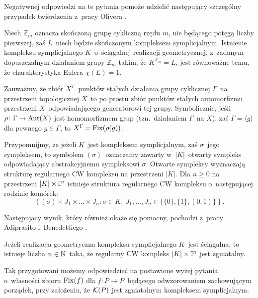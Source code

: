 Negatywnej odpowiedzi na te pytania pomoże udzielić następujący szczególny przypadek twierdzenia z~pracy Olivera \cite{Oliver75}.

\begin{tw}\label{tw_olivera}
Niech $\mathbb{Z}_m$ oznacza skończoną grupę cykliczną rzędu $m$, nie będącego potęgą liczby pierwszej, zaś $L$~niech będzie skończonym kompleksem symplicjalnym. Istnienie kompleksu symplicjalnego $K$~o~ściągalnej realizacji geometrycznej, z~zadanym dopuszczalnym działaniem grupy $\mathbb{Z}_m$ takim, że $K^{\mathbb{Z}_m}=L$, jest równoważne temu, że charakterystyka Eulera $\chi(L)=1$.
\end{tw}

Zauważmy, że zbiór $X^\Gamma$~punktów stałych działania grupy cyklicznej $\Gamma$~na przestrzeni topologicznej $X$~to po prostu zbiór punktów stałych automorfizmu przestrzeni $X$~odpowiadającego generatorowi tej grupy. Symbolicznie, jeśli \mbox{$\rho\colon \Gamma\to \operatorname{Aut}(X)$} jest homomorfizmem grup (tzn.~działaniem $\Gamma$~na $X$), zaś $\Gamma=\langle g\rangle$ dla pewnego $g\in \Gamma$, to $X^\Gamma=\operatorname{Fix}(\rho(g))$.

Przypomnijmy, że jeżeli $K$~jest kompleksem symplicjalnym, zaś $\sigma$~jego sympleksem, to symbolem $(\sigma)$~oznaczamy zawarty w~$|K|$~otwarty sympleks odpowiadający abstrakcyjnemu sympleksowi $\sigma$. Otwarte sympleksy wyznaczają strukturę regularnego CW kompleksu na przestrzeni $|K|$. Dla $n\geq 0$ na przestrzeni $|K|\times \mathbb{I}^n$ istnieje struktura regularnego CW kompleksu o~następującej rodzinie komórek:
\[\left\{(\sigma)\times J_1\times\ldots \times J_n:\sigma\in K,\ J_1,\ldots, J_n\in \big\{\{0\},\{1\},(0,1)\big\}\right\}.\]

Następujacy wynik, który również okaże się pomocny, pochodzi z~pracy Adiprasito i~Benedettiego \cite{Adiprasito13a}. 

\begin{tw}\label{tw_benedetti-adiprasito_o_zgniatalnosci_produktu_z_odcinkiem}
Jeżeli realizacja geometryczna kompleksu symplicjalnego $K$~jest ściągalna, to istnieje liczba $n\in\mathbb{N}$~taka, że regularny CW kompleks $|K|\times \mathbb{I}^n$ jest zgniatalny.
\end{tw}

Tak przygotowani możemy odpowiedzieć na postawione wyżej pytania o~własności zbioru $\operatorname{Fix}(f)$ dla $f\colon P\to P$~będącego odwzorowaniem zachowującym porządek, przy założeniu, że $\mathcal{K}(P)$ jest zgniatalnym kompleksem symplicjalnym.

